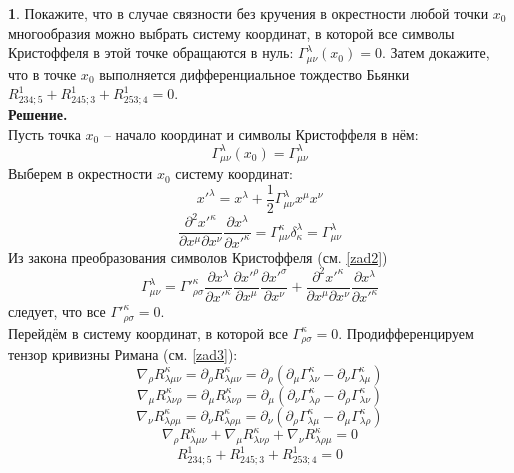 \documentclass[12pt]{article}
\theoremstyle{definition}
\newtheorem{zad}{}[section]
\begin{document}
\begin{zad}
Покажите, что в случае связности без кручения в окрестности любой точки $x_0$ многообразия можно выбрать систему координат, в которой все символы Кристоффеля в этой точке обращаются в нуль: $\Gamma^\lambda_{\mu\nu}(x_0) = 0$. Затем докажите, что в точке $x_0$ выполняется дифференциальное тождество Бьянки $R^1_{234;5}+R^1_{245;3}+R^1_{253;4}=0$.\\
\textbf{Решение.}\\
Пусть точка $x_0$ -- начало координат и символы Кристоффеля в нём:
\begin{equation}
    \Gamma^\lambda_{\mu\nu}(x_0)=\Gamma^\lambda_{\mu\nu}
\end{equation}
Выберем в окрестности $x_0$ систему координат:
\begin{equation}
    x'^\lambda=x^\lambda+\frac{1}{2}\Gamma^\lambda_{\mu\nu}x^\mu x^\nu
\end{equation}
\begin{equation}
    \frac{\partial^2 x'^\kappa}{\partial x^\mu\partial x^\nu}\frac{\partial x^\lambda}{\partial x'^\kappa}=\Gamma^\kappa_{\mu\nu}\delta^\lambda_\kappa=\Gamma^\lambda_{\mu\nu}
\end{equation}
Из закона преобразования символов Кристоффеля (см. \ref{zad2})
\begin{equation}
    \Gamma^\lambda_{\mu\nu}=\Gamma'^\kappa_{\rho\sigma}\frac{\partial x^\lambda}{\partial x'^\kappa}\frac{\partial x'^\rho}{\partial x^\mu}\frac{\partial x'^\sigma}{\partial x^\nu}+\frac{\partial^2 x'^\kappa}{\partial x^\mu\partial x^\nu}\frac{\partial x^\lambda}{\partial x'^\kappa}
\end{equation}
следует, что все $\Gamma'^\kappa_{\rho\sigma}=0$.\\
Перейдём в систему координат, в которой все $\Gamma^\kappa_{\rho\sigma}=0$. Продифференцируем тензор кривизны Римана (см. \ref{zad3}):
\begin{equation}
    \nabla_\rho R^\kappa_{\lambda\mu\nu}=\partial_\rho R^\kappa_{\lambda\mu\nu}=\partial_\rho(\partial_\mu\Gamma^\kappa_{\lambda\nu}-\partial_\nu\Gamma^\kappa_{\lambda\mu})
\end{equation}
\begin{equation}
    \nabla_\mu R^\kappa_{\lambda\nu\rho}=\partial_\mu R^\kappa_{\lambda\nu\rho}=\partial_\mu(\partial_\nu\Gamma^\kappa_{\lambda\rho}-\partial_\rho\Gamma^\kappa_{\lambda\nu})
\end{equation}
\begin{equation}
    \nabla_\nu R^\kappa_{\lambda\rho\mu}=\partial_\nu R^\kappa_{\lambda\rho\mu}=\partial_\nu(\partial_\rho\Gamma^\kappa_{\lambda\mu}-\partial_\mu\Gamma^\kappa_{\lambda\rho})
\end{equation}
\begin{equation}
    \nabla_\rho R^\kappa_{\lambda\mu\nu}+\nabla_\mu R^\kappa_{\lambda\nu\rho}+\nabla_\nu R^\kappa_{\lambda\rho\mu}=0
\end{equation}
\begin{equation}
    \boxed{R^1_{234;5}+R^1_{245;3}+R^1_{253;4}=0}
\end{equation}
\end{zad}
\end{document}
